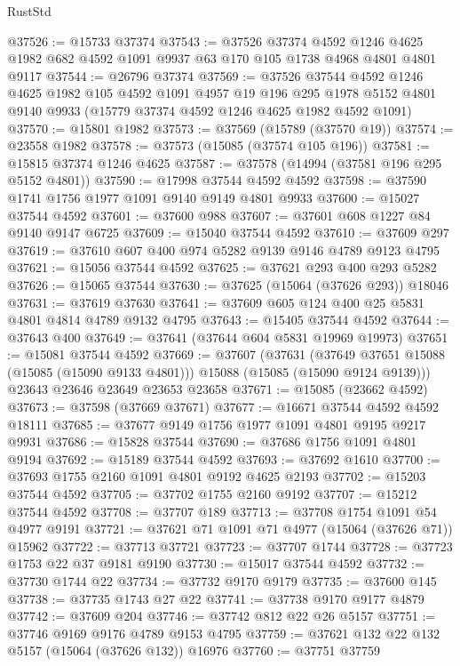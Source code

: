 \begin{lexlean}{RustStd}
\begin{coremodule}
@37526 := @15733 @37374
@37543 := @37526
    @37374
    @4592
    @1246
    @4625
    @1982
    @682
    @4592
    @1091
    @9937
    @63
    @170
    @105
    @1738
    @4968
    @4801
    @4801
    @9117
@37544 := @26796 @37374
@37569 := @37526
    @37544
    @4592
    @1246
    @4625
    @1982
    @105
    @4592
    @1091
    @4957
    @19
    @196
    @295
    @1978
    @5152
    @4801
    @9140
    @9933
    (@15779 @37374 @4592 @1246 @4625 @1982 @4592 @1091)
@37570 := @15801 @1982
@37573 := @37569 (@15789 (@37570 @19))
@37574 := @23558 @1982
@37578 := @37573 (@15085 (@37574 @105 @196))
@37581 := @15815 @37374 @1246 @4625
@37587 := @37578 (@14994 (@37581 @196 @295 @5152 @4801))
@37590 := @17998 @37544 @4592 @4592
@37598 := @37590 @1741 @1756 @1977 @1091 @9140 @9149 @4801 @9933
@37600 := @15027 @37544 @4592
@37601 := @37600 @988
@37607 := @37601 @608 @1227 @84 @9140 @9147 @6725
@37609 := @15040 @37544 @4592
@37610 := @37609 @297
@37619 := @37610 @607 @400 @974 @5282 @9139 @9146 @4789 @9123 @4795
@37621 := @15056 @37544 @4592
@37625 := @37621 @293 @400 @293 @5282
@37626 := @15065 @37544
@37630 := @37625 (@15064 (@37626 @293)) @18046
@37631 := @37619 @37630
@37641 := @37609 @605 @124 @400 @25 @5831 @4801 @4814 @4789 @9132 @4795
@37643 := @15405 @37544 @4592
@37644 := @37643 @400
@37649 := @37641 (@37644 @604 @5831 @19969 @19973)
@37651 := @15081 @37544 @4592
@37669 := @37607
    (@37631
      (@37649 @37651 @15088 (@15085 (@15090 @9133 @4801)))
      @15088
      (@15085 (@15090 @9124 @9139)))
    @23643
    @23646
    @23649
    @23653
    @23658
@37671 := @15085 (@23662 @4592)
@37673 := @37598 (@37669 @37671)
@37677 := @16671 @37544 @4592 @4592 @18111
@37685 := @37677 @9149 @1756 @1977 @1091 @4801 @9195 @9217 @9931
@37686 := @15828 @37544
@37690 := @37686 @1756 @1091 @4801 @9194
@37692 := @15189 @37544 @4592
@37693 := @37692 @1610
@37700 := @37693 @1755 @2160 @1091 @4801 @9192 @4625 @2193
@37702 := @15203 @37544 @4592
@37705 := @37702 @1755 @2160 @9192
@37707 := @15212 @37544 @4592
@37708 := @37707 @189
@37713 := @37708 @1754 @1091 @54 @4977 @9191
@37721 := @37621 @71 @1091 @71 @4977 (@15064 (@37626 @71)) @15962
@37722 := @37713 @37721
@37723 := @37707 @1744
@37728 := @37723 @1753 @22 @37 @9181 @9190
@37730 := @15017 @37544 @4592
@37732 := @37730 @1744 @22
@37734 := @37732 @9170 @9179
@37735 := @37600 @145
@37738 := @37735 @1743 @27 @22
@37741 := @37738 @9170 @9177 @4879
@37742 := @37609 @204
@37746 := @37742 @812 @22 @26 @5157
@37751 := @37746 @9169 @9176 @4789 @9153 @4795
@37759 := @37621 @132 @22 @132 @5157 (@15064 (@37626 @132)) @16976
@37760 := @37751 @37759

\end{coremodule}
\end{lexlean}
